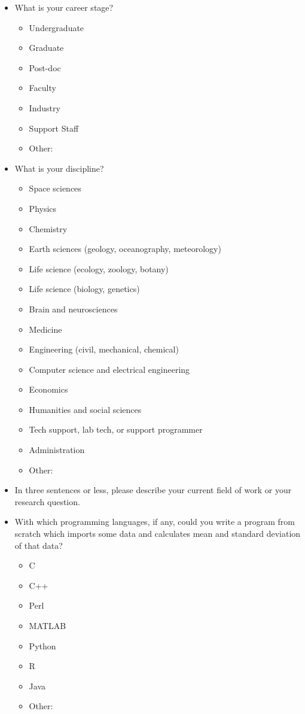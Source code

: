 \documentclass[10pt,a4paper,twocolumn]{article}
\begin{document}
\begin{itemize}

\item
  What is your career stage?
  \begin{itemize}[noitemsep]
    \item Undergraduate
    \item Graduate
    \item Post-doc
    \item Faculty
    \item Industry
    \item Support Staff
    \item Other:
  \end{itemize}

\item
  What is your discipline?
  \begin{itemize}[noitemsep]
    \item Space sciences
    \item Physics
    \item Chemistry
    \item Earth sciences (geology, oceanography, meteorology)
    \item Life science (ecology, zoology, botany)
    \item Life science (biology, genetics)
    \item Brain and neurosciences
    \item Medicine
    \item Engineering (civil, mechanical, chemical)
    \item Computer science and electrical engineering
    \item Economics
    \item Humanities and social sciences
    \item Tech support, lab tech, or support programmer
    \item Administration
    \item Other:
  \end{itemize}

\item
  In three sentences or less, please describe your current field of
  work or your research question.

\item
  With which programming languages, if any, could you write a program
  from scratch which imports some data and calculates mean and
  standard deviation of that data?
  \begin{itemize}[noitemsep]
    \item C
    \item C++
    \item Perl
    \item MATLAB
    \item Python
    \item R
    \item Java
    \item Other:
  \end{itemize}


\end{itemize}
\end{document}
